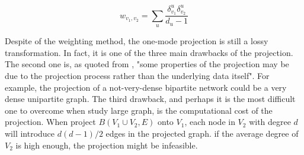 \begin{equation*}
	w_{v_1, v_2} = \sum_u \frac{\delta^u_{v_1}\delta^u_{v_2}}{d_u - 1}
\end{equation*}

Despite of the weighting method, the one-mode projection is still a lossy transformation.
In fact, it is one of the three main drawbacks of the projection.
The second one is, as quoted from \parencite{latapy2006},
"some properties of the projection may be due to the projection process rather than the underlying data itself".
For example, the projection of a not-very-dense bipartite network could be a very dense unipartite graph.
The third drawback, and perhaps it is the most difficult one to overcome when study large graph,
is the computational cost of the projection.
When project $B(V_1 \cup V_2, E)$ onto $V_1$,
each node in $V_2$ with degree $d$ will introduce $d(d-1)/2$ edges in the projected graph.
if the average degree of $V_2$ is high enough, the projection might be infeasible.

